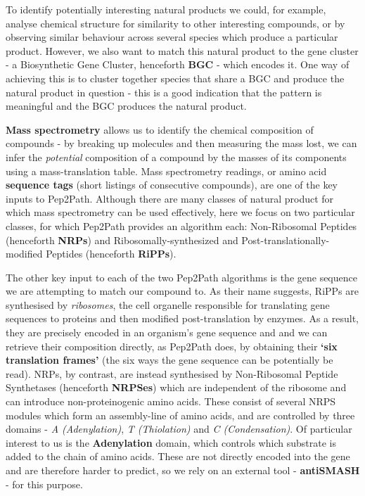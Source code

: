 \documentclass{l4proj}
\newcommand{\cit}[1]{\citep{#1}}
\begin{document}
To identify potentially interesting natural products we could, for example, analyse chemical structure for similarity to other interesting compounds, or by observing similar behaviour across several species which produce a particular product. 
However, we also want to match this natural product to the gene cluster - a Biosynthetic Gene Cluster, henceforth \textbf{BGC} - which encodes it.
One way of achieving this is to cluster together species that share a BGC and produce the natural product in question - this is a good indication that the pattern is meaningful and the BGC produces the natural product.

\textbf{Mass spectrometry} allows us to identify the chemical composition of compounds - by breaking up molecules and then measuring the mass lost, we can infer the \textit{potential} composition of a compound by the masses of its components using a mass-translation table. Mass spectrometry readings, or amino acid \textbf{sequence tags} (short listings of consecutive compounds), are one of the key inputs to Pep2Path. Although there are many classes of natural product for which mass spectrometry can be used effectively, \cit{msomics} here we focus on two particular classes, for which Pep2Path provides an algorithm each: Non-Ribosomal Peptides (henceforth \textbf{NRPs}) and Ribosomally-synthesized and Post-translationally-modified Peptides (henceforth \textbf{RiPPs}). 

The other key input to each of the two Pep2Path algorithms is the gene sequence we are attempting to match our compound to. As their name suggests, RiPPs are synthesised by \textit{ribosomes}, the cell organelle responsible for translating gene sequences to proteins and then modified post-translation by enzymes. As a result, they are precisely encoded in an organism's gene sequence and and we can retrieve their composition directly, as Pep2Path does, by obtaining their \textbf{`six translation frames'} (the six ways the gene sequence can be potentially be read). NRPs, by contrast, are instead synthesised by Non-Ribosomal Peptide Synthetases (henceforth \textbf{NRPSes}) which are independent of the ribosome and can introduce non-proteinogenic amino acids. These consist of several NRPS modules which form an assembly-line of amino acids, and are controlled by three domains - \textit{A (Adenylation)}, \textit{T (Thiolation)} and \textit{C (Condensation)}. Of particular interest to us is the \textbf{Adenylation} domain, which controls which substrate is added to the chain of amino acids. These are not directly encoded into the gene and are therefore harder to predict, so we rely on an external tool - \textbf{antiSMASH} \cit{as4} - for this purpose.
\end{document}
